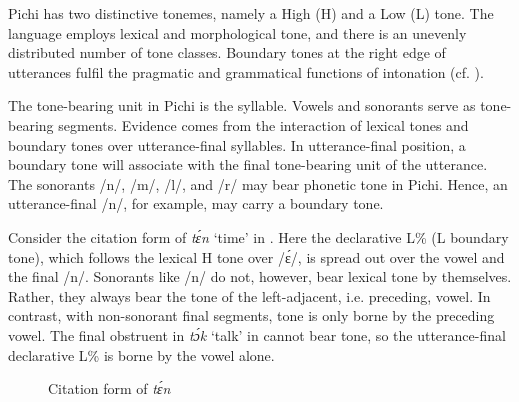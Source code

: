 Pichi has two distinctive tonemes, namely a High (H) and a Low (L) tone. The language employs lexical and morphological tone, and there is an unevenly distributed number of tone classes. Boundary tones at the right edge of utterances fulfil the pragmatic and grammatical functions of intonation (cf. ).

The tone-bearing unit in Pichi is the syllable. Vowels and sonorants serve as tone-bearing segments. Evidence comes from the interaction of lexical tones and boundary tones over utterance-final syllables. In utterance-final position, a boundary tone will associate with the final tone-bearing unit of the utterance. The sonorants /n/, /m/, /l/, and /r/ may bear phonetic tone in Pichi. Hence, an utterance-final /n/, for example, may carry a boundary tone. 

Consider the citation form of \textit{tɛ́n} ‘time’ in . Here the declarative L\% (L boundary tone), which follows the lexical H tone over /ɛ́/, is spread out over the vowel and the final /n/. Sonorants like /n/ do not, however, bear lexical tone by themselves. Rather, they always bear the tone of the left-adjacent, i.e. preceding, vowel. In contrast, with non-sonorant final segments, tone is only borne by the preceding vowel. The final obstruent in \textit{tɔ́k} ‘talk’ in  cannot bear tone, so the utterance-final declarative L\% is borne by the vowel alone.

	
\begin{figure}
	\caption{Citation form of \textit{tɛ́n}}
	\label{fig:key:3.1}
\end{figure}

